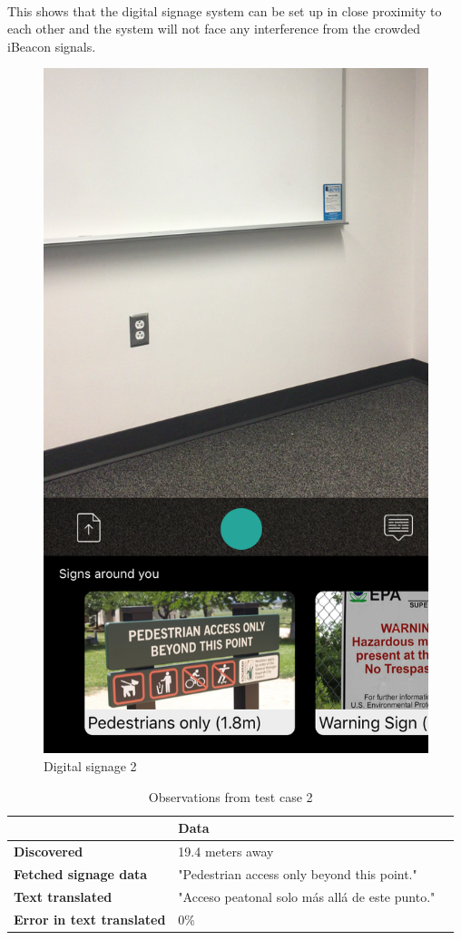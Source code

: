 \documentclass[12pt]{article}
\begin{document}
\paragraph{}This shows that the digital signage system can be set up in close proximity to each other and the system will not face any interference from the crowded iBeacon signals. 

       \begin{figure}[H]
	\centering
	\includegraphics[width=0.5\linewidth]{media/case1.png}
	\caption{Digital signage 2}
	\label{fig:eng}
\end{figure} 

\begin{table}%
    \centering
   
    \label{my-label}
       \begin{tabular}{|p{30mm}|p{55mm}|p{35mm}|}
 \hline
  & \textbf{Data}  \\ [0.5ex] 
 \hline\hline
 \textbf{Discovered} & 19.4 meters away  \\ 
 \hline
 \textbf{Fetched signage data} & "Pedestrian access only beyond this point."  \\
 \hline
 \textbf{Text translated} &  "Acceso peatonal solo más allá de este punto." \\
 \hline
 \textbf{Error in text translated} & 0\%   \\ [1ex] 
 \hline
    \end{tabular}
     \caption{Observations from test case 2} 
\end{table}
\end{document}
